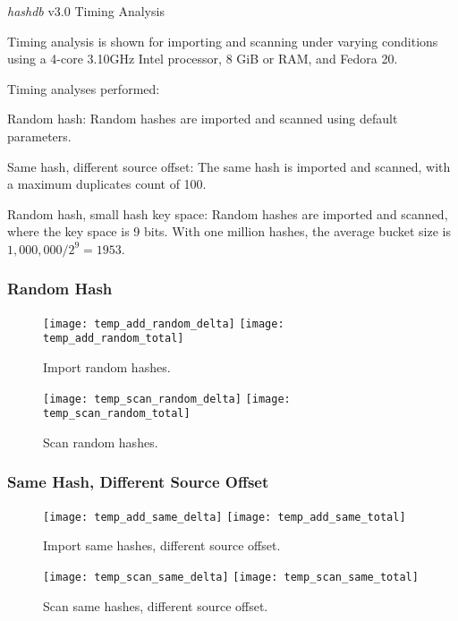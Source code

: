 \documentclass[12pt,twoside]{article}
\newcommand{\hdb}{\emph{hashdb}\xspace}
\begin{document}
\begin{center}
\Large \hdb v3.0 Timing Analysis
\end{center}

Timing analysis is shown for importing and scanning under varying conditions
using a 4-core 3.10GHz Intel processor, 8 GiB or RAM, and Fedora 20.

Timing analyses performed:
\begin{compactitem}
\item Random hash: Random hashes are imported and scanned using default parameters.
\item Same hash, different source offset: The same hash is imported and scanned, with a maximum duplicates count of 100.
\item Random hash, small hash key space: Random hashes are imported and scanned, where the key space is 9 bits.  With one million hashes, the average bucket size is $1,000,000 / 2^{9} = 1953$.
\end{compactitem}

\subsubsection* {Random Hash}

\begin{figure}[H]
  \center
  \texttt{[image: temp\_add\_random\_delta]}
  \texttt{[image: temp\_add\_random\_total]}
  \caption*{Import random hashes.}
\end{figure}

\begin{figure}[H]
  \center
  \texttt{[image: temp\_scan\_random\_delta]}
  \texttt{[image: temp\_scan\_random\_total]}
  \caption*{Scan random hashes.}
\end{figure}

\subsubsection* {Same Hash, Different Source Offset}

\begin{figure}[H]
  \center
  \texttt{[image: temp\_add\_same\_delta]}
  \texttt{[image: temp\_add\_same\_total]}
  \caption*{Import same hashes, different source offset.}
\end{figure}

\begin{figure}[H]
  \center
  \texttt{[image: temp\_scan\_same\_delta]}
  \texttt{[image: temp\_scan\_same\_total]}
  \caption*{Scan same hashes, different source offset.}
\end{figure}
\end{document}
